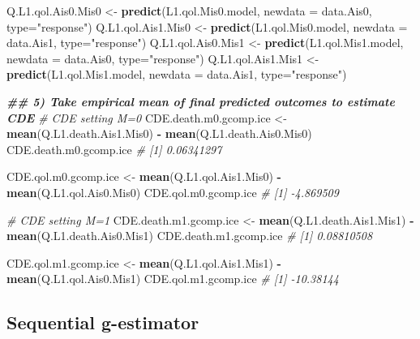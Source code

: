 \documentclass[
]{book}
\newenvironment{Shaded}{\begin{snugshade}}{\end{snugshade}}
\newcommand{\AttributeTok}[1]{\textcolor[rgb]{0.13,0.29,0.53}{#1}}
\newcommand{\CommentTok}[1]{\textcolor[rgb]{0.56,0.35,0.01}{\textit{#1}}}
\newcommand{\DocumentationTok}[1]{\textcolor[rgb]{0.56,0.35,0.01}{\textbf{\textit{#1}}}}
\newcommand{\FunctionTok}[1]{\textcolor[rgb]{0.13,0.29,0.53}{\textbf{#1}}}
\newcommand{\NormalTok}[1]{#1}
\newcommand{\OtherTok}[1]{\textcolor[rgb]{0.56,0.35,0.01}{#1}}
\newcommand{\SpecialCharTok}[1]{\textcolor[rgb]{0.81,0.36,0.00}{\textbf{#1}}}
\newcommand{\StringTok}[1]{\textcolor[rgb]{0.31,0.60,0.02}{#1}}
\begin{document}
\begin{Shaded}
\begin{Highlighting}[]
\NormalTok{Q.L1.qol.Ais0.Mis0 }\OtherTok{\textless{}{-}} \FunctionTok{predict}\NormalTok{(L1.qol.Mis0.model, }\AttributeTok{newdata =}\NormalTok{ data.Ais0, }\AttributeTok{type=}\StringTok{"response"}\NormalTok{)}
\NormalTok{Q.L1.qol.Ais1.Mis0 }\OtherTok{\textless{}{-}} \FunctionTok{predict}\NormalTok{(L1.qol.Mis0.model, }\AttributeTok{newdata =}\NormalTok{ data.Ais1, }\AttributeTok{type=}\StringTok{"response"}\NormalTok{)}
\NormalTok{Q.L1.qol.Ais0.Mis1 }\OtherTok{\textless{}{-}} \FunctionTok{predict}\NormalTok{(L1.qol.Mis1.model, }\AttributeTok{newdata =}\NormalTok{ data.Ais0, }\AttributeTok{type=}\StringTok{"response"}\NormalTok{)}
\NormalTok{Q.L1.qol.Ais1.Mis1 }\OtherTok{\textless{}{-}} \FunctionTok{predict}\NormalTok{(L1.qol.Mis1.model, }\AttributeTok{newdata =}\NormalTok{ data.Ais1, }\AttributeTok{type=}\StringTok{"response"}\NormalTok{)}

\DocumentationTok{\#\# 5) Take empirical mean of final predicted outcomes to estimate CDE}
\CommentTok{\# CDE setting M=0}
\NormalTok{CDE.death.m0.gcomp.ice }\OtherTok{\textless{}{-}} \FunctionTok{mean}\NormalTok{(Q.L1.death.Ais1.Mis0) }\SpecialCharTok{{-}} \FunctionTok{mean}\NormalTok{(Q.L1.death.Ais0.Mis0)}
\NormalTok{CDE.death.m0.gcomp.ice}
\CommentTok{\# [1] 0.06341297}

\NormalTok{CDE.qol.m0.gcomp.ice }\OtherTok{\textless{}{-}} \FunctionTok{mean}\NormalTok{(Q.L1.qol.Ais1.Mis0) }\SpecialCharTok{{-}} \FunctionTok{mean}\NormalTok{(Q.L1.qol.Ais0.Mis0)}
\NormalTok{CDE.qol.m0.gcomp.ice}
\CommentTok{\# [1] {-}4.869509}

\CommentTok{\# CDE setting M=1}
\NormalTok{CDE.death.m1.gcomp.ice }\OtherTok{\textless{}{-}} \FunctionTok{mean}\NormalTok{(Q.L1.death.Ais1.Mis1) }\SpecialCharTok{{-}} \FunctionTok{mean}\NormalTok{(Q.L1.death.Ais0.Mis1)}
\NormalTok{CDE.death.m1.gcomp.ice}
\CommentTok{\# [1] 0.08810508}

\NormalTok{CDE.qol.m1.gcomp.ice }\OtherTok{\textless{}{-}} \FunctionTok{mean}\NormalTok{(Q.L1.qol.Ais1.Mis1) }\SpecialCharTok{{-}} \FunctionTok{mean}\NormalTok{(Q.L1.qol.Ais0.Mis1)}
\NormalTok{CDE.qol.m1.gcomp.ice}
\CommentTok{\# [1] {-}10.38144}
\end{Highlighting}
\end{Shaded}

\hypertarget{sequential-g-estimator}{%
\subsection{Sequential g-estimator}\label{sequential-g-estimator}}
\end{document}
